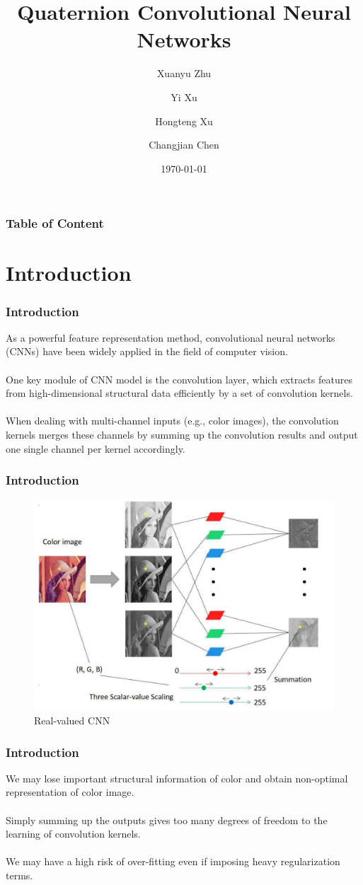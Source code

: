\documentclass{beamer}
\title{Quaternion Convolutional Neural Networks}
\author{Xuanyu Zhu\and Yi Xu \and  Hongteng Xu\and Changjian Chen}
\date{\today}
\begin{document}
\begin{frame}
    \titlepage
\end{frame}

\begin{frame}
    \frametitle{Table of Content}
    \tableofcontents
\end{frame}

\section{Introduction}
\begin{frame}
    \frametitle{Introduction}

    As a powerful feature representation method, convolutional neural networks (CNNs) have been widely applied in the field of computer vision. 
    \\~\\
    One key module of CNN model is the convolution layer, which extracts features from high-dimensional structural data efficiently by a set of convolution kernels. 
    \\~\\
    When dealing with multi-channel inputs (e.g., color images), the convolution kernels merges these channels by summing up the convolution results and output one single channel per kernel accordingly.
\end{frame}


\begin{frame}
    \frametitle{Introduction}
    \begin{figure}[H]
        \centering
        \includegraphics[width=.7\textwidth]{img/pic1.jpg}
        \caption{Real-valued CNN}
    \end{figure}
\end{frame}

\begin{frame}
    \frametitle{Introduction}

    We may lose important structural information of color and obtain non-optimal representation of color image.
    \\~\\
    Simply summing up the outputs gives too many degrees of freedom to the learning of convolution kernels.
    \\~\\
    We may have a high risk of over-fitting even if imposing heavy regularization terms.
\end{frame}
\end{document}
